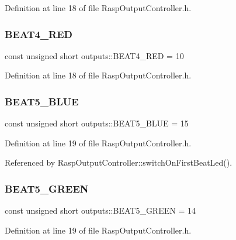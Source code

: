 Definition at line 18 of file Rasp\+Output\+Controller.\+h.

\mbox{\label{namespaceoutputs_a73a38f1135a723ebb294500daa641aec}} 
\subsubsection{\texorpdfstring{B\+E\+A\+T4\+\_\+\+R\+ED}{BEAT4\_RED}}
{\footnotesize\ttfamily const unsigned short outputs\+::\+B\+E\+A\+T4\+\_\+\+R\+ED = 10}



Definition at line 18 of file Rasp\+Output\+Controller.\+h.

\mbox{\label{namespaceoutputs_a0fab71f89a857d67f1329fbd097046ae}} 
\subsubsection{\texorpdfstring{B\+E\+A\+T5\+\_\+\+B\+L\+UE}{BEAT5\_BLUE}}
{\footnotesize\ttfamily const unsigned short outputs\+::\+B\+E\+A\+T5\+\_\+\+B\+L\+UE = 15}



Definition at line 19 of file Rasp\+Output\+Controller.\+h.



Referenced by Rasp\+Output\+Controller\+::switch\+On\+First\+Beat\+Led().

\mbox{\label{namespaceoutputs_a4b1e0d3ad2b80752a68cdec9a73f5ac6}} 
\subsubsection{\texorpdfstring{B\+E\+A\+T5\+\_\+\+G\+R\+E\+EN}{BEAT5\_GREEN}}
{\footnotesize\ttfamily const unsigned short outputs\+::\+B\+E\+A\+T5\+\_\+\+G\+R\+E\+EN = 14}



Definition at line 19 of file Rasp\+Output\+Controller.\+h.


